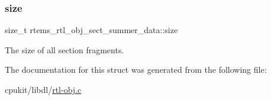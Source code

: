 \subsubsection{\texorpdfstring{size}{size}}
{\footnotesize\ttfamily size\+\_\+t rtems\+\_\+rtl\+\_\+obj\+\_\+sect\+\_\+summer\+\_\+data\+::size}

The size of all section fragments. 

The documentation for this struct was generated from the following file\+:\begin{DoxyCompactItemize}
\item 
cpukit/libdl/\mbox{\hyperlink{rtl-obj_8c}{rtl-\/obj.\+c}}\end{DoxyCompactItemize}

